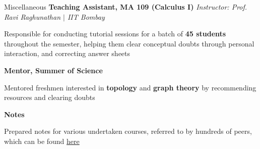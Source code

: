 \begin{rubric}{Miscellaneous}
    \entry*[2020] \textbf{Teaching Assistant, MA 109 (Calculus I)} \hfill \emph{Instructor: Prof. Ravi Raghunathan $\mid$ IIT Bombay}
	    
	    Responsible for conducting tutorial sessions for a batch of \textbf{45 students} throughout the semester, helping them clear conceptual doubts through personal interaction, and correcting answer sheets

	\entry*[2021--2022] \textbf{Mentor, Summer of Science}

		Mentored freshmen interested in \textbf{topology} and \textbf{graph theory} by recommending resources and clearing doubts

	\entry*[2020--2022] \textbf{Notes}

		Prepared notes for various undertaken courses, referred to by hundreds of peers, which can be found \href{https://amitrajaraman.github.io/notes}{here}


\end{rubric}